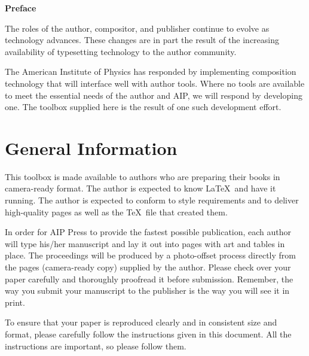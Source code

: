 \addtocounter{page}{-1}
\thispagestyle{empty}


\newpage

\begin{center}
\LARGE\bf
Preface
\vspace{2pc}
\end{center}

The roles of the author, compositor, and publisher continue to evolve as
technology advances. These changes are in part the result of the increasing
availability of typesetting technology to the author community.

\vspace{1pc}

The American Institute of Physics has responded by implementing composition
technology that will interface well with author tools. Where no tools are
available to meet the essential needs of the author and AIP, we will respond
by developing one. The toolbox supplied here is the result of one such
development effort.


\egroup

\newpage

\def\contentsname{\LARGE\bf Contents}

{\large
\tableofcontents
}


\twocolumn

\section{General Information}

This toolbox is made available to authors who are preparing their books
in camera-ready format. The author is expected to know \LaTeX\ and have it
running. The author is expected to conform to style requirements and to
deliver high-quality pages as well as the \TeX\ file that created them.

In order for AIP Press to provide the fastest possible publication, each
author will type his/her manuscript and lay it out into pages with art and
tables in place. The proceedings will be produced by a photo-offset process
directly from the pages (camera-ready copy) supplied by the author.
Please check over your paper carefully and thoroughly proofread
it before submission. Remember, the way you submit your manuscript
to the publisher is the way you will see it in print.

To ensure that your paper is reproduced clearly and in consistent size
and format, please carefully follow the instructions given in this
document. All the instructions are important, so please follow them.


